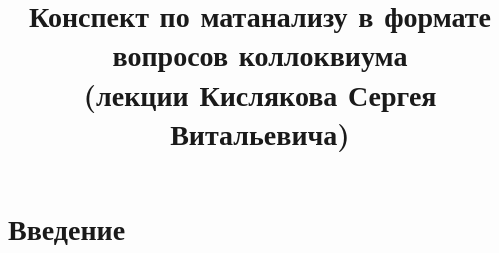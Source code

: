 \documentclass[12pt]{report}
\title{Конспект по матанализу в формате вопросов коллоквиума \\ (лекции Кислякова Сергея Витальевича)}
\begin{document}
\maketitle
\clearpage
\tableofcontents
\clearpage

\renewcommand{\proofname}{Proof}

\theoremstyle{plain}
\newtheorem{thm}{Theorem}[section]
\newtheorem*{aks}{Аксиома}[section]
\newtheorem*{lm}{Lemma}
\newtheorem*{st}{Statement}
\newtheorem*{prop}{Property}

\theoremstyle{definition}
\newtheorem{defn}{Def}
\newtheorem*{ex}{Example}
\newtheorem*{exs}{Examples}
\newtheorem*{cor}{Corollary}
\newtheorem*{name}{Name}

\theoremstyle{remark}
\newtheorem*{rem}{Remain}
\newtheorem*{note}{Note}
\newtheorem*{probl}{Exercise}

\newcommand{\Z}{\mathbb{Z}}
\newcommand{\N}{\mathbb{N}}
\newcommand{\R}{\mathbb{R}}
\newcommand{\Q}{\mathbb{Q}}
\newcommand{\K}{\mathbb{K}}
\newcommand{\Cm}{\mathbb{C}}
\newcommand{\Pm}{\mathbb{P}}
\newcommand{\ilim}{\int\limits}
\newcommand{\slim}{\sum\limits}
\newcommand{\pivi}{\stackrel \circ }

\chapter{Введение}
\end{document}
